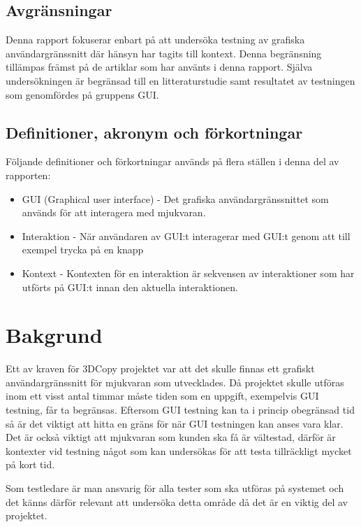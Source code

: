 \subsection{Avgränsningar}

Denna rapport fokuserar enbart på att undersöka testning av grafiska användargränssnitt där hänsyn har tagits till kontext. Denna begränsning tillämpas främst på de artiklar som har använts i denna rapport. Själva undersökningen är begränsad till en litteraturstudie samt resultatet av testningen som genomfördes på gruppens GUI.

\subsection{Definitioner, akronym och förkortningar}
Följande definitioner och förkortningar används på flera ställen i denna del av rapporten:
\begin{itemize}
	\item GUI (Graphical user interface) - Det grafiska användargränssnittet som används för att interagera med mjukvaran.
	\item Interaktion - När användaren av GUI:t interagerar med GUI:t genom att till exempel trycka på en knapp
	\item Kontext - Kontexten för en interaktion är sekvensen av interaktioner som har utförts på GUI:t innan den aktuella interaktionen.
\end{itemize}

\section{Bakgrund}
\label{sec:background-holmberg}

Ett av kraven för 3DCopy projektet var att det skulle finnas ett grafiskt användargränssnitt för mjukvaran som utvecklades. Då projektet skulle utföras inom ett visst antal timmar måste tiden som en uppgift, exempelvis GUI testning, får ta begränsas. Eftersom GUI testning kan ta i princip obegränsad tid så är det viktigt att hitta en gräns för när GUI testningen kan anses vara klar. Det är också viktigt att mjukvaran som kunden ska få är vältestad, därför är kontexter vid testning något som kan undersökas för att testa tillräckligt mycket på kort tid.

Som testledare är man ansvarig för alla tester som ska utföras på systemet och det känns därför relevant att undersöka detta område då det är en viktig del av projektet.

